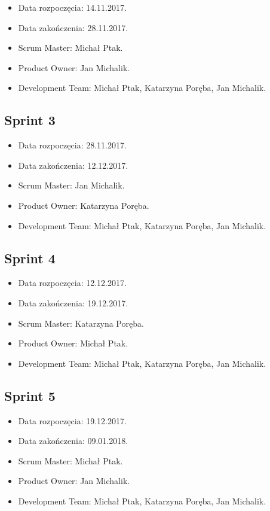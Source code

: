 \documentclass[a4paper]{article}
\begin{document}
\begin{itemize}
\item Data rozpoczęcia: 14.11.2017.
\item Data zakończenia: 28.11.2017.
\item Scrum Master: Michał Ptak.
\item Product Owner: Jan Michalik.
\item Development Team: Michał Ptak, Katarzyna Poręba, Jan Michalik.
\end{itemize}

\subsection{Sprint 3}

\begin{itemize}
\item Data rozpoczęcia: 28.11.2017.
\item Data zakończenia: 12.12.2017.
\item Scrum Master: Jan Michalik.
\item Product Owner: Katarzyna Poręba.
\item Development Team: Michał Ptak, Katarzyna Poręba, Jan Michalik.
\end{itemize}

\subsection{Sprint 4}

\begin{itemize}
\item Data rozpoczęcia: 12.12.2017.
\item Data zakończenia: 19.12.2017.
\item Scrum Master: Katarzyna Poręba.
\item Product Owner: Michał Ptak.
\item Development Team: Michał Ptak, Katarzyna Poręba, Jan Michalik.
\end{itemize}

\subsection{Sprint 5}

\begin{itemize}
\item Data rozpoczęcia: 19.12.2017.
\item Data zakończenia: 09.01.2018.
\item Scrum Master: Michał Ptak.
\item Product Owner: Jan Michalik.
\item Development Team: Michał Ptak, Katarzyna Poręba, Jan Michalik.
\end{itemize}
\end{document}
